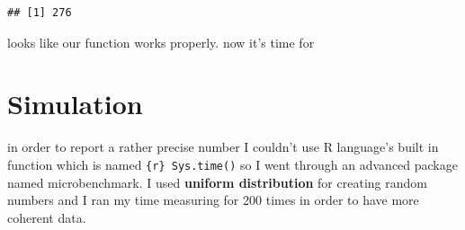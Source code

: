 \documentclass[]{article}
\begin{document}
\begin{verbatim}
## [1] 276
\end{verbatim}

looks like our function works properly. now it's time for

\section{Simulation}\label{simulation}

in order to report a rather precise number I couldn't use R language's
built in function which is named \texttt{\{r\}\ Sys.time()} so I went
through an advanced package named microbenchmark. I used \textbf{uniform
distribution} for creating random numbers and I ran my time measuring
for 200 times in order to have more coherent data.
\end{document}
